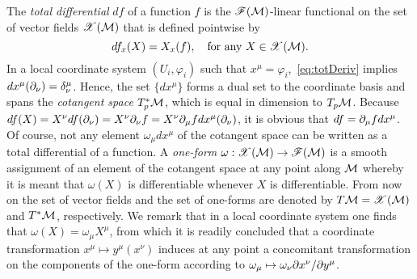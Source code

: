 \documentclass[
final,
11pt,
a4paper,
DIV=11,
headinclude=true,
footinclude=false,
bibliography=totoc,
twoside=true,  %
BCOR=5mm
]{scrbook}
\begin{document}
The \emph{total differential} $df$ of a function $f$ is the 
$\mathscr{F}(\mathcal{M})$-linear functional on the set of vector 
fields $\mathscr{X}(\mathcal{M})$ that is defined pointwise by
\begin{equation}
\label{eq:totDeriv}
  df_x(X) = X_x(f),
  \quad\text{for any}~X\in\mathscr{X}(\mathcal{M}).
\end{equation}
In a local coordinate system $(U_i,\varphi_i)$ such that $x^\mu = 
\varphi_i$,~\eqref{eq:totDeriv} implies $dx^\mu(\partial_\nu) = 
\delta^\mu_\nu$.  Hence, the set $\{dx^\mu\}$ forms a dual set to 
the coordinate basis and spans the \emph{cotangent space} 
$T^\ast_p\mathcal{M}$, which is equal in dimension to $T_p\mathcal{M}$.  
Because $df(X) = X^\nu df(\partial_\nu) = X^\nu\partial_\nu f = X^\nu 
\partial_\mu f dx^\mu(\partial_\nu)$, it is obvious that $df = \partial_\mu f 
dx^\mu$.  Of course, not any element $\omega_\mu dx^\mu$ of the 
cotangent space can be written as a total differential of a 
function.  A \emph{one-form} $\omega : \mathscr{X}(\mathcal{M}) \to 
\mathscr{F}(\mathcal{M})$ is a smooth assignment of an element of the 
cotangent space at any point along $\mathcal{M}$ whereby it is meant 
that $\omega(X)$ is differentiable whenever $X$ is 
differentiable.  From now on the set of vector fields and the set 
of one-forms are denoted by $T\mathcal{M} = \mathscr{X}(\mathcal{M})$ and 
$T^\ast\mathcal{M}$, respectively.  We remark that in a local 
coordinate system one finds that $\omega(X) = \omega_\mu X^\mu$, 
from which it is readily concluded that a coordinate 
transformation $x^\mu \mapsto y^\mu(x^\nu)$ induces at any point 
a concomitant transformation on the components of the one-form 
according to $\omega_\mu \mapsto \omega_\nu \partial x^\nu / \partial 
y^\mu$.
\end{document}
